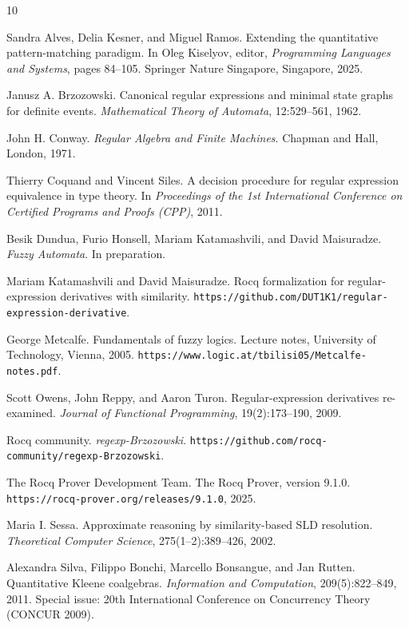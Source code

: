 \documentclass{easychair}
\begin{document}
\begin{thebibliography}{10}

Sandra Alves, Delia Kesner, and Miguel Ramos.
\newblock Extending the quantitative pattern-matching paradigm.
\newblock In Oleg Kiselyov, editor, \emph{Programming Languages and Systems},
pages 84--105.
\newblock Springer Nature Singapore, Singapore, 2025.

Janusz A. Brzozowski.
\newblock Canonical regular expressions and minimal state graphs for definite events.
\newblock \emph{Mathematical Theory of Automata}, 12:529--561, 1962.

John H. Conway.
\newblock \emph{Regular Algebra and Finite Machines}.
\newblock Chapman and Hall, London, 1971.

Thierry Coquand and Vincent Siles.
\newblock A decision procedure for regular expression equivalence in type theory.
\newblock In \emph{Proceedings of the 1st International Conference on Certified Programs and Proofs (CPP)}, 2011.

Besik Dundua, Furio Honsell, Mariam Katamashvili, and David Maisuradze.
\newblock \emph{Fuzzy Automata}.
\newblock In preparation.

Mariam Katamashvili and David Maisuradze.
\newblock Rocq formalization for regular-expression derivatives with similarity.
\newblock \texttt{https://github.com/DUT1K1/regular-expression-derivative}.

George Metcalfe.
\newblock Fundamentals of fuzzy logics.
\newblock Lecture notes, University of Technology, Vienna, 2005.
\newblock \texttt{https://www.logic.at/tbilisi05/Metcalfe-notes.pdf}.

Scott Owens, John Reppy, and Aaron Turon.
\newblock Regular-expression derivatives re-examined.
\newblock \emph{Journal of Functional Programming}, 19(2):173--190, 2009.

Rocq community.
\newblock \emph{regexp-Brzozowski}.
\newblock \texttt{https://github.com/rocq-community/regexp-Brzozowski}.

The Rocq Prover Development Team.
\newblock The Rocq Prover, version 9.1.0.
\newblock \texttt{https://rocq-prover.org/releases/9.1.0}, 2025.

Maria I. Sessa.
\newblock Approximate reasoning by similarity-based SLD resolution.
\newblock \emph{Theoretical Computer Science}, 275(1--2):389--426, 2002.

Alexandra Silva, Filippo Bonchi, Marcello Bonsangue, and Jan Rutten.
\newblock Quantitative Kleene coalgebras.
\newblock \emph{Information and Computation}, 209(5):822--849, 2011.
\newblock Special issue: 20th International Conference on Concurrency Theory
(CONCUR 2009).

\end{thebibliography}
\end{document}

